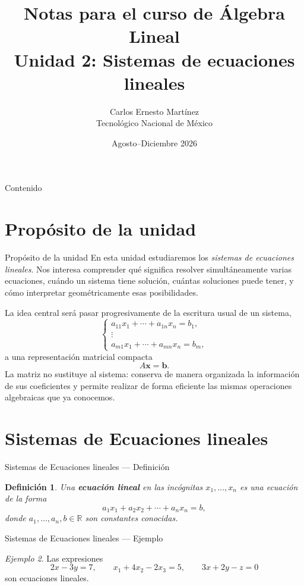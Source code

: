 \documentclass[aspectratio=169,11pt]{beamer}
\title[Álgebra Lineal — Unidad 2]{\textbf{Notas para el curso de Álgebra Lineal}\\[0.35cm]\Large Unidad 2: Sistemas de ecuaciones lineales}
\author{Carlos Ernesto Martínez\\Tecnológico Nacional de México}
\date{Agosto--Diciembre 2026}
\newtheorem{definicion}{Definición}[section]
\theoremstyle{remark}
\newtheorem{ejemplo}[definicion]{Ejemplo}
\newcommand{\R}{\mathbb{R}}
\begin{document}
\begin{frame}\titlepage\end{frame}
\begin{frame}[allowframebreaks]{Contenido}\tableofcontents\end{frame}
\section*{Propósito de la unidad}
\begin{frame}[allowframebreaks]{Propósito de la unidad}
\footnotesize
En esta unidad estudiaremos los \emph{sistemas de ecuaciones lineales}. Nos interesa comprender qué significa resolver simultáneamente varias ecuaciones, cuándo un sistema tiene solución, cuántas soluciones puede tener, y cómo interpretar geométricamente esas posibilidades.

La idea central será pasar progresivamente de la escritura usual de un sistema,
\[
\begin{cases}
a_{11}x_1+\cdots+a_{1n}x_n=b_1,\\
\vdots\\
a_{m1}x_1+\cdots+a_{mn}x_n=b_m,
\end{cases}
\]
a una representación matricial compacta
\[
A\mathbf{x}=\mathbf{b}.
\]
La matriz no sustituye al sistema: conserva de manera organizada la información de sus coeficientes y permite realizar de forma eficiente las mismas operaciones algebraicas que ya conocemos.

\end{frame}

\section{Sistemas de Ecuaciones lineales}
\begin{frame}[shrink=5]{Sistemas de Ecuaciones lineales — Definición}
\footnotesize
\begin{definicion}
Una \textbf{ecuación lineal} en las incógnitas $x_1,\ldots,x_n$ es una ecuación de la forma
\[
a_1x_1+a_2x_2+\cdots+a_nx_n=b,
\]
donde $a_1,\ldots,a_n,b\in\R$ son constantes conocidas.
\end{definicion}
\end{frame}

\begin{frame}[shrink=5]{Sistemas de Ecuaciones lineales — Ejemplo}
\footnotesize
\begin{ejemplo}
Las expresiones
\[
2x-3y=7,\qquad x_1+4x_2-2x_3=5,\qquad 3x+2y-z=0
\]
son ecuaciones lineales.
\end{ejemplo}
\end{frame}
\end{document}
